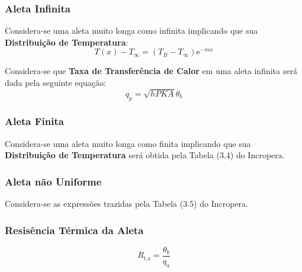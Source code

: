 \documentclass{article}
\begin{document}
        \subsubsection{Aleta Infinita}
            \begin{definition}
                Considera-se uma aleta muito longa como infinita implicando que sua \textbf{Distribuição de Temperatura}:
                    \begin{equation}
                        T(x) - T_{\infty} = 
                        (T_{B} - T_{\infty})\text{e}^{-mx}
                    \end{equation}
            \end{definition}
            \begin{definition}
                Considera-se que \textbf{Taxa de Transferência de Calor}  em uma aleta infinita será dada pela seguinte equação:
                    \begin{equation}
                        \boxed{
                            q_{p} = \sqrt{h P K A} \theta_{b}
                        }
                    \end{equation}
            \end{definition}

        \subsubsection{Aleta Finita}
            \begin{definition}
                Considera-se uma aleta muito longa como finita implicando que sua \textbf{Distribuição de Temperatura} será obtida pela Tabela (3.4) do Incropera.
            \end{definition}

        \subsubsection{Aleta não Uniforme}
            \begin{definition}
                Considera-se as expressões trazidas pela Tabela (3.5) do Incropera.
            \end{definition}

        \subsubsection{Resisência Térmica da Aleta}
            \begin{definition}
                \begin{equation}
                    \boxed{
                        R_{\text{t,a}} = \frac{\theta_{b}}{q_{a}}
                    }
                \end{equation}
            \end{definition}
\end{document}
